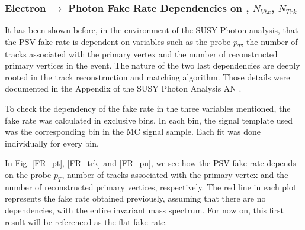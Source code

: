 \subsubsection{Electron $\rightarrow$ Photon Fake Rate Dependencies on \pt, $N_{Vtx}$, $N_{Trk}$}

It has been shown before, in the environment of the SUSY Photon analysis\cite{susyphoton_slides}, that the PSV fake rate is dependent on variables such as the probe $p_T$, the number of tracks associated with the primary vertex and the number of reconstructed primary vertices in the event. The nature of the two last dependencies are deeply rooted in the track reconstruction and matching algorithm. Those details were documented in the Appendix of the SUSY Photon Analysis AN \cite{CMS_AN_2014-128}.

To check the dependency of the fake rate in the three variables mentioned, the fake rate was calculated in exclusive bins. In each bin, the signal template used was the corresponding bin in the MC signal sample. Each fit was done individually for every bin.

In  Fig. \ref{FR_pt}, \ref{FR_trk} and \ref{FR_pu}, we see how the PSV fake rate depends on the probe $p_T$, number of tracks associated with the primary vertex and the number of reconstructed primary vertices, respectively. The red line in each plot represents the fake rate obtained previously, assuming that there are no dependencies, with the entire invariant mass spectrum. For now on, this first result will be referenced as the flat fake rate.


